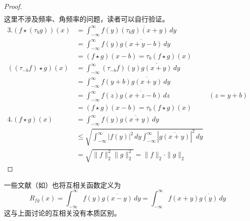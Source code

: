 \begin{proof}
\begin{align*}
\end{align*}这里不涉及频率、角频率的问题，读者可以自行验证。
\begin{align*}
    3.\left(f\star (\tau_b g)\right)(x)  & =\int_{-\infty}^{\infty}f(y)\overline{(\tau_b g)(x+y)}\,dy                                                  \\
                              & =\int_{-\infty}^{\infty}f(y)\overline{g(x+y-b)}\,dy                                                         \\
                              & =(f\star g)(x-b)=\tau_{b} (f\star g)(x)                                                                     \\
    ( (\tau_{-b}f)\star g)(x) & =\int_{-\infty}^{\infty}(\tau_{-b}f)(y)\overline{g(x+y)}\,dy                                                \\
                              & =\int_{-\infty}^{\infty}f(y+b)\overline{g(x+y)}\,dy                                                         \\
                              & =\int_{-\infty}^{\infty}f(z)\overline{g(x+z-b)}\,dz                                               & (z=y+b) \\
                              & =(f\star g)(x-b)=\tau_{b} (f\star g)(x)                                                                     \\
    4. (f\star g)(x)          & =\int_{-\infty}^{\infty}f(y)\overline{g(x+y)}\,dy                                                           \\
                              & \leq \sqrt{\int_{-\infty}^{\infty}|f(y)|^2\,dy\int_{-\infty}^{\infty}\left|\overline{g(x+y)}\right|^2\,dy  }           \\
                              & =\sqrt{\|f\|_2^2\|g\|_2^2}=\|f\|_2\cdot\|g\|_2                                              
\end{align*}
\end{proof}

一些文献（如\cite{signal_systems}）也将互相关函数定义为
$$R_{fg}(x)=\int_{-\infty}^{\infty}f(y)\overline{g(x-y)}\,dy=\int_{-\infty}^{\infty}f(x+y)\overline{g(y)}\,dy$$
这与上面讨论的互相关没有本质区别。

